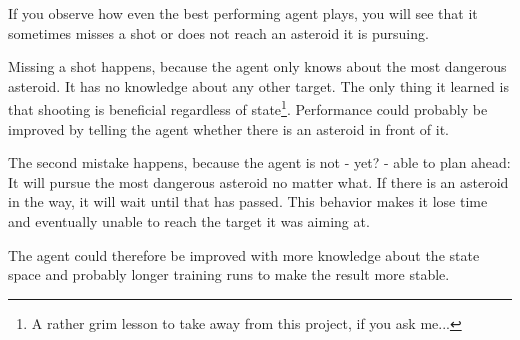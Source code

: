 \documentclass[a4paper,10pt]{article}
\begin{document}
If you observe how even the best performing agent plays, you will see that it sometimes misses a shot or does not reach an asteroid it is pursuing.

Missing a shot happens, because the agent only knows about the most dangerous asteroid.
It has no knowledge about any other target. The only thing it learned is that shooting is beneficial regardless of state\footnote{A rather grim lesson to take away from this project, if you ask me...}.
Performance could probably be improved by telling the agent whether there is an asteroid in front of it.

The second mistake happens, because the agent is not - yet? - able to plan ahead: It will pursue the most dangerous asteroid no matter what. If there is an asteroid in the way, it will wait until that has passed.
This behavior makes it lose time and eventually unable to reach the target it was aiming at.

The agent could therefore be improved with more knowledge about the state space and probably longer training runs to make the result more stable.




\end{document}
